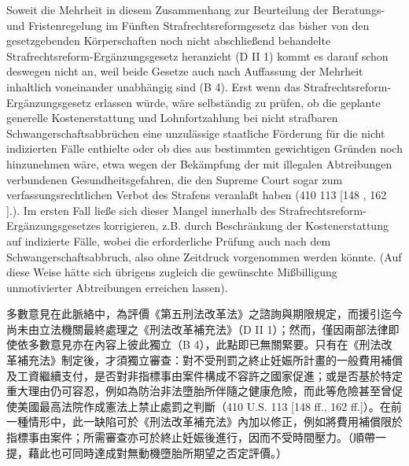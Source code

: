 \documentclass[12pt]{article}
\begin{document}
\syncleft
\begin{sourcepara}
Soweit die Mehrheit in diesem Zusammenhang zur Beurteilung der Beratungs- und Fristenregelung im Fünften Strafrechtsreformgesetz das bisher von den gesetzgebenden Körperschaften noch nicht abschließend behandelte Strafrechtsreform-Ergänzungsgesetz heranzieht (D II 1) kommt es darauf schon deswegen nicht an, weil beide Gesetze auch nach Auffassung der Mehrheit inhaltlich voneinander unabhängig sind (B 4). Erst wenn das Strafrechtsreform-Ergänzungsgesetz erlassen würde, wäre selbständig zu prüfen, ob die geplante generelle Kostenerstattung und Lohnfortzahlung bei nicht strafbaren Schwangerschaftsabbrüchen eine unzulässige staatliche Förderung für die nicht indizierten Fälle enthielte oder ob dies aus bestimmten gewichtigen Gründen noch hinzunehmen wäre, etwa wegen der Bekämpfung der mit illegalen Abtreibungen verbundenen Gesundheitsgefahren, die den Supreme Court sogar zum verfassungsrechtlichen Verbot des Strafens veranlaßt haben (410 \abbrUS{} 113 [148 \abbrFF{}, 162 \abbrFF{}].). Im ersten Fall ließe sich dieser Mangel innerhalb des Strafrechtsreform-Ergänzungsgesetzes korrigieren, z.B. durch Beschränkung der Kostenerstattung auf indizierte Fälle, wobei die erforderliche Prüfung auch nach dem Schwangerschaftsabbruch, also ohne Zeitdruck vorgenommen werden könnte. (Auf diese Weise hätte sich übrigens zugleich die gewünschte Mißbilligung unmotivierter Abtreibungen erreichen lassen).
\end{sourcepara}
\begin{transpara}
多數意見在此脈絡中，為評價《第五刑法改革法》之諮詢與期限規定，而援引迄今尚未由立法機關最終處理之《刑法改革補充法》（D II 1）；然而，僅因兩部法律即使依多數意見亦在內容上彼此獨立（B 4），此點即已無關緊要。只有在《刑法改革補充法》制定後，才須獨立審查：對不受刑罰之終止妊娠所計畫的一般費用補償及工資繼續支付，是否對非指標事由案件構成不容許之國家促進；或是否基於特定重大理由仍可容忍，例如為防治非法墮胎所伴隨之健康危險，而此等危險甚至曾促使美國最高法院作成憲法上禁止處罰之判斷（410 U.S. 113 [148 ff., 162 ff.]）。在前一種情形中，此一缺陷可於《刑法改革補充法》內加以修正，例如將費用補償限於指標事由案件；所需審查亦可於終止妊娠後進行，因而不受時間壓力。（順帶一提，藉此也可同時達成對無動機墮胎所期望之否定評價。）
\end{transpara}
\end{document}
